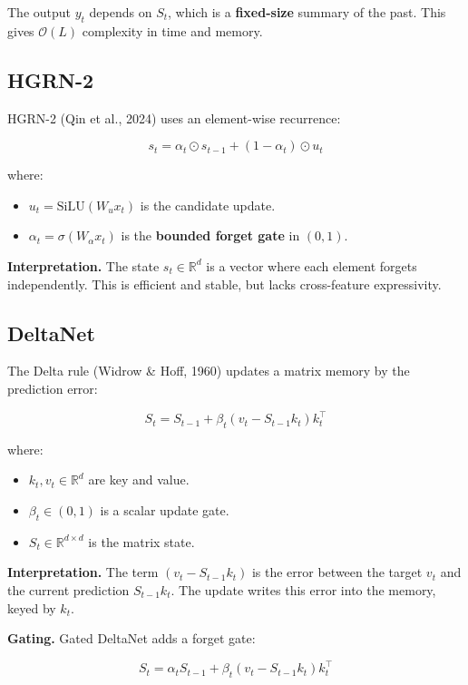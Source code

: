 The output $y_t$ depends on $S_t$, which is a \textbf{fixed-size} summary of the 
past. This gives $\mathcal{O}(L)$ complexity in time and memory.

\subsection{HGRN-2}

HGRN-2 (Qin et al., 2024) uses an element-wise recurrence:

\[
s_t = \alpha_t \odot s_{t-1} + (1 - \alpha_t) \odot u_t
\tag{3.2}
\]

where:

\begin{itemize}
\item $u_t = \text{SiLU}(W_u x_t)$ is the candidate update.
\item $\alpha_t = \sigma(W_\alpha x_t)$ is the \textbf{bounded forget gate} in $(0, 1)$.

\end{itemize}
\textbf{Interpretation.} The state $s_t \in \mathbb{R}^d$ is a vector where each 
element forgets independently. This is efficient and stable, but lacks 
cross-feature expressivity.

\subsection{DeltaNet}

The Delta rule (Widrow \& Hoff, 1960) updates a matrix memory by the 
prediction error:

\[
S_t = S_{t-1} + \beta_t (v_t - S_{t-1} k_t) k_t^\top
\tag{3.3}
\]

where:

\begin{itemize}
\item $k_t, v_t \in \mathbb{R}^d$ are key and value.
\item $\beta_t \in (0, 1)$ is a scalar update gate.
\item $S_t \in \mathbb{R}^{d \times d}$ is the matrix state.

\end{itemize}
\textbf{Interpretation.} The term $(v_t - S_{t-1} k_t)$ is the error between the 
target $v_t$ and the current prediction $S_{t-1} k_t$. The update writes this 
error into the memory, keyed by $k_t$.

\textbf{Gating.} Gated DeltaNet adds a forget gate:

\[
S_t = \alpha_t S_{t-1} + \beta_t (v_t - S_{t-1} k_t) k_t^\top
\tag{3.4}
\]

